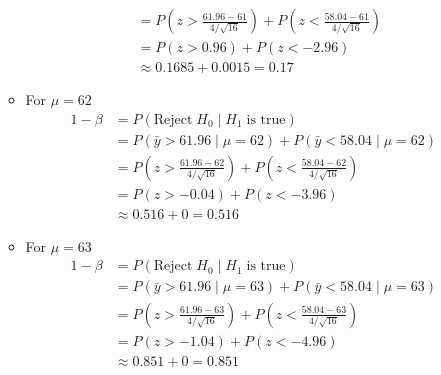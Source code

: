 \documentclass{uofa-eng-assignment}
\begin{document}
\begin{enumerate}
\begin{itemize}
\begin{align*}
                                & = P(z > \frac{61.96 - 61}{4 / \sqrt{16}}) + P(z <\frac{58.04 - 61}{4 / \sqrt{16}})                   \\
                                & = P(z > 0.96) +  P(z < -2.96)                                                                        \\
                                & \approx 0.1685 + 0.0015                                                                       = 0.17
                  \end{align*}
            \item For $\mu = 62$
                  \begin{align*}
                      1 - \beta & = P(\text{Reject}\;H_0\;|\;H_1\;\text{is true})                                                     \\
                                & = P(\bar{y} > 61.96\;|\;\mu = 62) + P(\bar{y} < 58.04\;|\;\mu = 62)                                 \\
                                & = P(z > \frac{61.96 - 62}{4 / \sqrt{16}}) + P(z <\frac{58.04 - 62}{4 / \sqrt{16}})                  \\
                                & = P(z > -0.04) +  P(z < -3.96)                                                                      \\
                                & \approx 0.516 + 0                                                                           = 0.516
                  \end{align*}
            \item For $\mu = 63$
                  \begin{align*}
                      1 - \beta & = P(\text{Reject}\;H_0\;|\;H_1\;\text{is true})                                                 \\
                                & = P(\bar{y} > 61.96\;|\;\mu = 63) + P(\bar{y} < 58.04\;|\;\mu = 63)                             \\
                                & = P(z > \frac{61.96 - 63}{4 / \sqrt{16}}) + P(z <\frac{58.04 - 63}{4 / \sqrt{16}})              \\
                                & = P(z > -1.04) +  P(z < -4.96)                                                                  \\
                                & \approx 0.851 + 0                                                                       = 0.851
                  \end{align*}

\end{itemize}
\end{enumerate}
\end{document}
